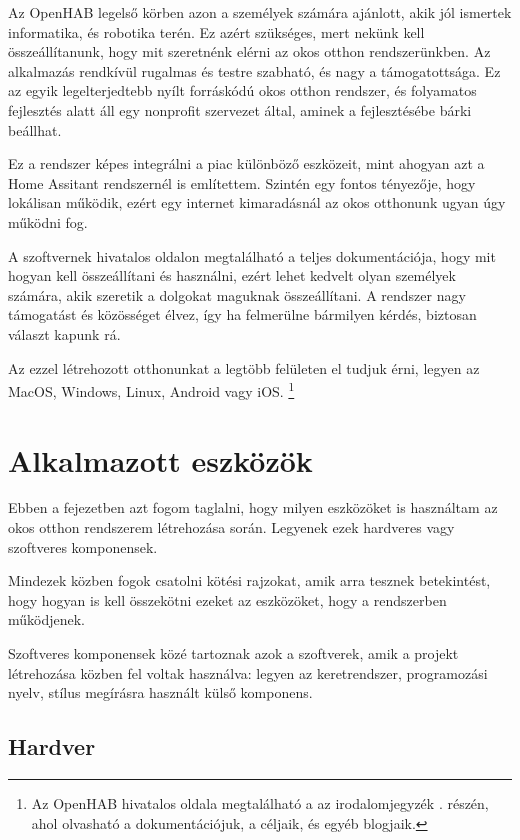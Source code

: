 \documentclass[
]{thesis-ekf}
\theoremstyle{definition}
\theoremstyle{remark}
\begin{document}
	Az OpenHAB legelső körben azon a személyek számára ajánlott, akik jól ismertek informatika, és robotika terén. Ez azért szükséges, mert nekünk kell összeállítanunk, hogy mit szeretnénk elérni az okos otthon rendszerünkben. Az alkalmazás rendkívül rugalmas és testre szabható, és nagy a támogatottsága. Ez az egyik legelterjedtebb nyílt forráskódú okos otthon rendszer, és folyamatos fejlesztés alatt áll egy nonprofit szervezet által, aminek a fejlesztésébe bárki beállhat.
	
	Ez a rendszer képes integrálni a piac különböző eszközeit, mint ahogyan azt a Home Assitant rendszernél is említettem. Szintén egy fontos tényezője, hogy lokálisan működik, ezért egy internet kimaradásnál az okos otthonunk ugyan úgy működni fog. 
	
	A szoftvernek hivatalos oldalon megtalálható a teljes dokumentációja, hogy mit hogyan kell összeállítani és használni, ezért lehet kedvelt olyan személyek számára, akik szeretik a dolgokat maguknak összeállítani. A rendszer nagy támogatást és közösséget élvez, így ha felmerülne bármilyen kérdés, biztosan választ kapunk rá.
	
	Az ezzel létrehozott otthonunkat a legtöbb felületen el tudjuk érni, legyen az MacOS, Windows, Linux, Android vagy iOS.
	\footnote{Az OpenHAB hivatalos oldala megtalálható a az irodalomjegyzék \cite{openhab}. részén, ahol olvasható a dokumentációjuk, a céljaik, és egyéb blogjaik.}
	
	\chapter{Alkalmazott eszközök}
	
	Ebben a fejezetben azt fogom taglalni, hogy milyen eszközöket is használtam az okos otthon rendszerem létrehozása során. Legyenek ezek hardveres vagy szoftveres komponensek. 
	
	Mindezek közben fogok csatolni kötési rajzokat, amik arra tesznek betekintést, hogy hogyan is kell összekötni ezeket az eszközöket, hogy a rendszerben működjenek.
	
	Szoftveres komponensek közé tartoznak azok a szoftverek, amik a projekt létrehozása közben fel voltak használva: legyen az keretrendszer, programozási nyelv, stílus megírásra használt külső komponens.
	
	\section{Hardver}\label{hardware-sec}
\end{document}
